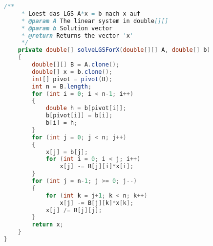 \begin{lstlisting}[caption=MatrixUtil (Istogu),label=list:MatrixUtil,language=Java]
    /**
     * Loest das LGS A*x = b nach x auf
     * @param A The linear system in double[][]
     * @param b Solution vector
     * @return Returns the vector 'x'
     */
    private double[] solveLGSForX(double[][] A, double[] b)
    {
        double[][] B = A.clone();
        double[] x = b.clone();
        int[] pivot = pivot(B);
        int n = B.length;
        for (int i = 0; i < n-1; i++)
        {
            double h = b[pivot[i]];
            b[pivot[i]] = b[i];
            b[i] = h;
        }
        for (int j = 0; j < n; j++)
        {
            x[j] = b[j];
            for (int i = 0; i < j; i++)
                x[j] -= B[j][i]*x[i];
        }
        for (int j = n-1; j >= 0; j--)
        {
            for (int k = j+1; k < n; k++)
                x[j] -= B[j][k]*x[k];
            x[j] /= B[j][j];
        }
        return x;
    }
}
\end{lstlisting}    

